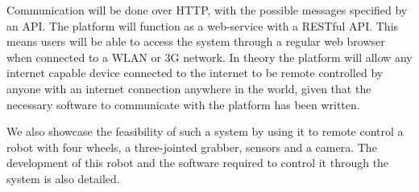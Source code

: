 
Communication will be done over HTTP, with the possible messages specified by an API.
The platform will function as a web-service with a RESTful API. %
This means users will be able to access the system through a regular web browser when connected to a WLAN or 3G network.
In theory the platform will allow any internet capable device connected to the internet to be remote controlled by anyone with an internet connection anywhere in the world, given that the necessary software to communicate with the platform has been written.

We also showcase the feasibility of such a system by using it to remote control a robot with four wheels, a three-jointed grabber, sensors and a camera.
The development of this robot and the software required to control it through the system is also detailed.
